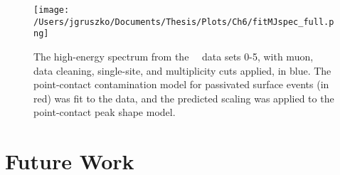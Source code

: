 \begin{figure}[]
 \centering
 \texttt{[image: /Users/jgruszko/Documents/Thesis/Plots/Ch6/fitMJspec\_full.png]}
 \caption[A comparison of the point contact contamination model to the \MJ\ \DEM\ energy spectrum]{The high-energy spectrum from the \MJ\ \DEM\, data sets 0-5, with muon, data cleaning, single-site, and multiplicity cuts applied, in blue. The point-contact contamination model for passivated surface events (in red) was fit to the data, and the predicted scaling was applied to the point-contact peak shape model.} 
 \label{fig:mjSpec_fit}
\end{figure}

\section{Future Work}


